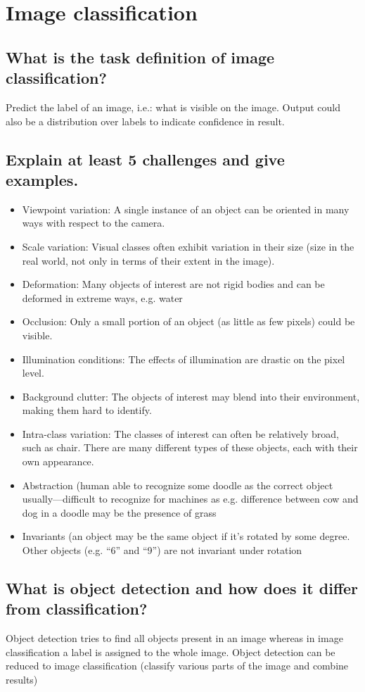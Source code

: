 \section{Image classification}
\subsection{What is the task definition of image classification?}
Predict the label of an image, i.e.: what is visible on the image. Output could also be a distribution over labels to indicate confidence in result.

\subsection{Explain at least 5 challenges and give examples.}
\begin{itemize}
\item Viewpoint variation: A single instance of an object can be oriented in many ways with respect to the camera.
\item Scale variation: Visual classes often exhibit variation in their size (size in the real world, not only in terms of their extent in the image).
\item Deformation: Many objects of interest are not rigid bodies and can be deformed in extreme ways, e.g. water
\item Occlusion: Only a small portion of an object (as little as few pixels) could be visible.
\item Illumination conditions: The effects of illumination are drastic on the pixel level.
\item Background clutter: The objects of interest may blend into their environment, making them hard to identify.
\item Intra-class variation: The classes of interest can often be relatively broad, such as chair. There are many different types of these objects, each with their own appearance.
\item Abstraction (human able to recognize some doodle as the correct object usually---difficult to recognize for machines as e.g. difference between cow and dog in a doodle may be the presence of grass
\item Invariants (an object may be the same object if it's rotated by some degree. Other objects (e.g. ``6'' and ``9'') are not invariant under rotation
\end{itemize}

\subsection{What is object detection and how does it differ from classification?}
Object detection tries to find all objects present in an image whereas in image classification a label is assigned to the whole image. Object detection can be reduced to image classification (classify various parts of the image and combine results)

